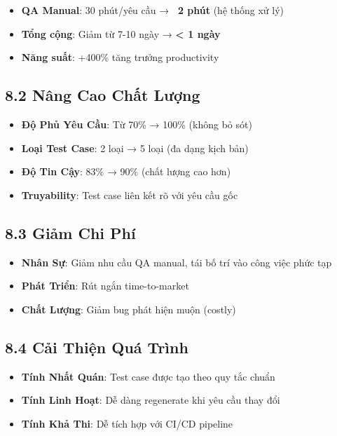 \documentclass[14pt,a4paper]{article}
\begin{document}
\begin{itemize}
    \item \textbf{QA Manual}: 30 phút/yêu cầu → \textbf{~2 phút} (hệ thống xử lý)
    \item \textbf{Tổng cộng}: Giảm từ 7-10 ngày → \textbf{< 1 ngày}
    \item \textbf{Năng suất}: +400\% tăng trưởng productivity
\end{itemize}

\subsection{8.2 Nâng Cao Chất Lượng}

\begin{itemize}
    \item \textbf{Độ Phủ Yêu Cầu}: Từ 70\% → 100\% (không bỏ sót)
    \item \textbf{Loại Test Case}: 2 loại → 5 loại (đa dạng kịch bản)
    \item \textbf{Độ Tin Cậy}: 83\% → 90\% (chất lượng cao hơn)
    \item \textbf{Truyability}: Test case liên kết rõ với yêu cầu gốc
\end{itemize}

\subsection{8.3 Giảm Chi Phí}

\begin{itemize}
    \item \textbf{Nhân Sự}: Giảm nhu cầu QA manual, tái bố trí vào công việc phức tạp
    \item \textbf{Phát Triển}: Rút ngắn time-to-market
    \item \textbf{Chất Lượng}: Giảm bug phát hiện muộn (costly)
\end{itemize}

\subsection{8.4 Cải Thiện Quá Trình}

\begin{itemize}
    \item \textbf{Tính Nhất Quán}: Test case được tạo theo quy tắc chuẩn
    \item \textbf{Tính Linh Hoạt}: Dễ dàng regenerate khi yêu cầu thay đổi
    \item \textbf{Tính Khả Thi}: Dễ tích hợp với CI/CD pipeline
\end{itemize}
\end{document}
